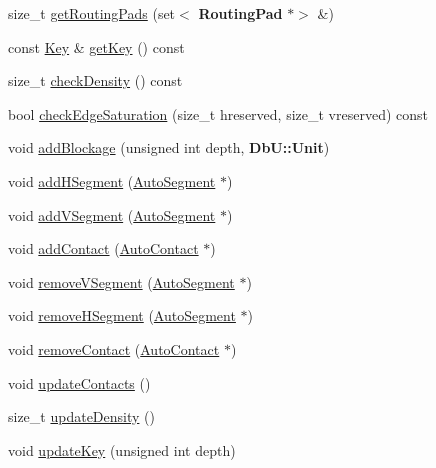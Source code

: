 \begin{DoxyCompactItemize}
size\+\_\+t \mbox{\hyperlink{classKatabatic_1_1GCell_a3bda8c3dbb2896a0e6e57f974d0c1cad}{get\+Routing\+Pads}} (set$<$ \textbf{ Routing\+Pad} $\ast$$>$ \&)
\item 
const \mbox{\hyperlink{classKatabatic_1_1GCell_1_1Key}{Key}} \& \mbox{\hyperlink{classKatabatic_1_1GCell_ade1e79e88bf4f4c173ffd083dd5470c9}{get\+Key}} () const
\item 
size\+\_\+t \mbox{\hyperlink{classKatabatic_1_1GCell_a88208864ba2268689946a8cb7a86fcb2}{check\+Density}} () const
\item 
bool \mbox{\hyperlink{classKatabatic_1_1GCell_af4dcc99733b7ea77e8c3c7da9ac3cd3c}{check\+Edge\+Saturation}} (size\+\_\+t hreserved, size\+\_\+t vreserved) const
\item 
void \mbox{\hyperlink{classKatabatic_1_1GCell_a1270eab34ac57f21c0286a5455044a0d}{add\+Blockage}} (unsigned int depth, \textbf{ Db\+U\+::\+Unit})
\item 
void \mbox{\hyperlink{classKatabatic_1_1GCell_a4aad7d6f7357fd7963aab91bc2019a1b}{add\+H\+Segment}} (\mbox{\hyperlink{classKatabatic_1_1AutoSegment}{Auto\+Segment}} $\ast$)
\item 
void \mbox{\hyperlink{classKatabatic_1_1GCell_a8aa815e9e99df8187e628f6ec9e9da77}{add\+V\+Segment}} (\mbox{\hyperlink{classKatabatic_1_1AutoSegment}{Auto\+Segment}} $\ast$)
\item 
void \mbox{\hyperlink{classKatabatic_1_1GCell_a2b84aab620bfca1064e988e94e7b9c59}{add\+Contact}} (\mbox{\hyperlink{classKatabatic_1_1AutoContact}{Auto\+Contact}} $\ast$)
\item 
void \mbox{\hyperlink{classKatabatic_1_1GCell_abe128484d8aa063198292a88c63f2bba}{remove\+V\+Segment}} (\mbox{\hyperlink{classKatabatic_1_1AutoSegment}{Auto\+Segment}} $\ast$)
\item 
void \mbox{\hyperlink{classKatabatic_1_1GCell_aff76aa96214c0efcf13186b8b3e5c852}{remove\+H\+Segment}} (\mbox{\hyperlink{classKatabatic_1_1AutoSegment}{Auto\+Segment}} $\ast$)
\item 
void \mbox{\hyperlink{classKatabatic_1_1GCell_aa052a9427fbd4185f00567a97770f80b}{remove\+Contact}} (\mbox{\hyperlink{classKatabatic_1_1AutoContact}{Auto\+Contact}} $\ast$)
\item 
void \mbox{\hyperlink{classKatabatic_1_1GCell_aa0beea2ceaa543503346967085036d1a}{update\+Contacts}} ()
\item 
size\+\_\+t \mbox{\hyperlink{classKatabatic_1_1GCell_a9b3455dce10eb98d0496175dd586528c}{update\+Density}} ()
\item 
void \mbox{\hyperlink{classKatabatic_1_1GCell_a11beff0f0bec06d0f3e080969516dfc3}{update\+Key}} (unsigned int depth)
$$
\end{DoxyCompactItemize}
